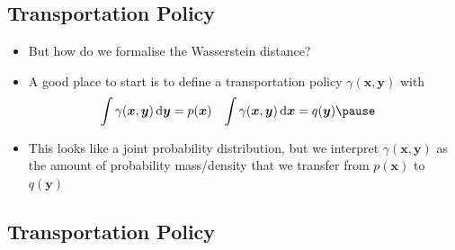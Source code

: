 \begin{slide}
\section{Transportation Policy}

\begin{PauseHighLight}
  \begin{itemize}
  \item But how do we formalise the Wasserstein distance?\pause
  \item A good place to start is to define a transportation policy
    $\gamma(\bm{x},\bm{y})$ with
    \begin{align*}
      \int \gamma(\bm{x},\bm{y}) \, \dd \bm{y} &= p(\bm{x}) &
      \int \gamma(\bm{x},\bm{y}) \, \dd \bm{x} &= q(\bm{y})\pause
    \end{align*}
  \item This looks like a joint probability distribution, but we
    interpret $\gamma(\bm{x},\bm{y})$ as the amount of probability
    mass/density that we transfer from $p(\bm{x})$ to $q(\bm{y})$\pause
  \end{itemize}
\end{PauseHighLight}

\end{slide}


\begin{slide}
\section[-2]{Transportation Policy}

\pb
\pause{}
\begin{center}
  \pause
\end{center}
\end{slide}


